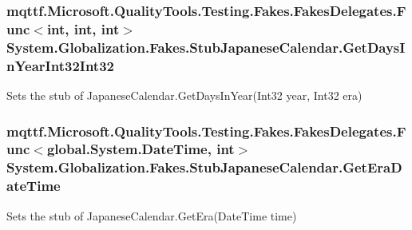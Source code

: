 \hypertarget{class_system_1_1_globalization_1_1_fakes_1_1_stub_japanese_calendar_a513ba76d072fa234b0fb6f48c3e42f22}{
\subsubsection[{Get\-Days\-In\-Year\-Int32\-Int32}]{\setlength{\rightskip}{0pt plus 5cm}mqttf.\-Microsoft.\-Quality\-Tools.\-Testing.\-Fakes.\-Fakes\-Delegates.\-Func$<$int, int, int$>$ System.\-Globalization.\-Fakes.\-Stub\-Japanese\-Calendar.\-Get\-Days\-In\-Year\-Int32\-Int32}}\label{class_system_1_1_globalization_1_1_fakes_1_1_stub_japanese_calendar_a513ba76d072fa234b0fb6f48c3e42f22}


Sets the stub of Japanese\-Calendar.\-Get\-Days\-In\-Year(\-Int32 year, Int32 era)

\hypertarget{class_system_1_1_globalization_1_1_fakes_1_1_stub_japanese_calendar_a173a1e13ae5c0eeed8ab717320c1b35b}{
\subsubsection[{Get\-Era\-Date\-Time}]{\setlength{\rightskip}{0pt plus 5cm}mqttf.\-Microsoft.\-Quality\-Tools.\-Testing.\-Fakes.\-Fakes\-Delegates.\-Func$<$global.\-System.\-Date\-Time, int$>$ System.\-Globalization.\-Fakes.\-Stub\-Japanese\-Calendar.\-Get\-Era\-Date\-Time}}\label{class_system_1_1_globalization_1_1_fakes_1_1_stub_japanese_calendar_a173a1e13ae5c0eeed8ab717320c1b35b}


Sets the stub of Japanese\-Calendar.\-Get\-Era(\-Date\-Time time)

